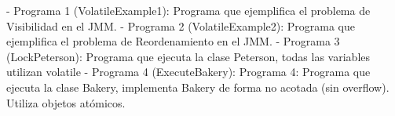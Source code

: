 - Programa 1 (VolatileExample1): Programa que ejemplifica el problema de Visibilidad en el JMM.
- Programa 2 (VolatileExample2): Programa que ejemplifica el problema de  Reordenamiento en el JMM. 
- Programa 3 (LockPeterson): Programa que ejecuta la clase Peterson, todas las variables utilizan volatile
- Programa 4 (ExecuteBakery): Programa 4: Programa que ejecuta la clase Bakery, implementa Bakery de forma no acotada (sin overflow). Utiliza objetos atómicos.